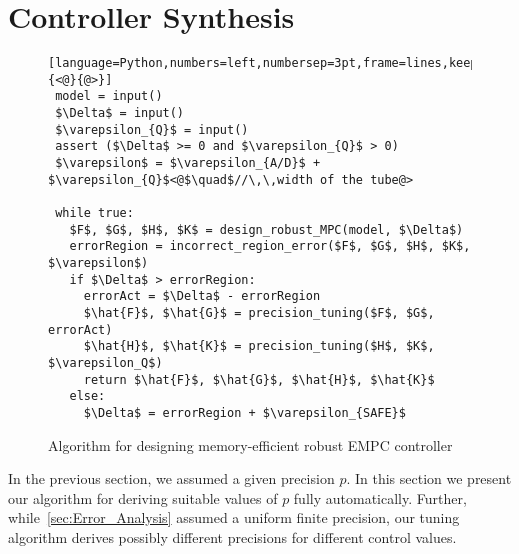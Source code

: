 \section{Controller Synthesis}\label{sec:Controller_Synthesis}

\begin{figure}
\begin{lstlisting}[language=Python,numbers=left,numbersep=3pt,frame=lines,keepspaces=true,mathescape=true,basicstyle=\small\ttfamily,escapeinside={<@}{@>}]
 model = input() 
 $\Delta$ = input()
 $\varepsilon_{Q}$ = input()
 assert ($\Delta$ >= 0 and $\varepsilon_{Q}$ > 0)
 $\varepsilon$ = $\varepsilon_{A/D}$ + $\varepsilon_{Q}$<@$\quad$//\,\,width of the tube@>

 while true:
   $F$, $G$, $H$, $K$ = design_robust_MPC(model, $\Delta$)
   errorRegion = incorrect_region_error($F$, $G$, $H$, $K$, $\varepsilon$)
   if $\Delta$ > errorRegion:
     errorAct = $\Delta$ - errorRegion
     $\hat{F}$, $\hat{G}$ = precision_tuning($F$, $G$, errorAct)
     $\hat{H}$, $\hat{K}$ = precision_tuning($H$, $K$, $\varepsilon_Q$)
     return $\hat{F}$, $\hat{G}$, $\hat{H}$, $\hat{K}$
   else:
     $\Delta$ = errorRegion + $\varepsilon_{SAFE}$
\end{lstlisting}
\caption{Algorithm for designing memory-efficient robust EMPC controller}
\label{lst:alg}
\end{figure}


In the previous section, we assumed a given precision $p$. In this section we
present our algorithm for deriving suitable values of $p$ fully automatically.
Further, while~\autoref{sec:Error_Analysis} assumed a uniform finite precision,
our tuning algorithm derives possibly different precisions for different control
values.

